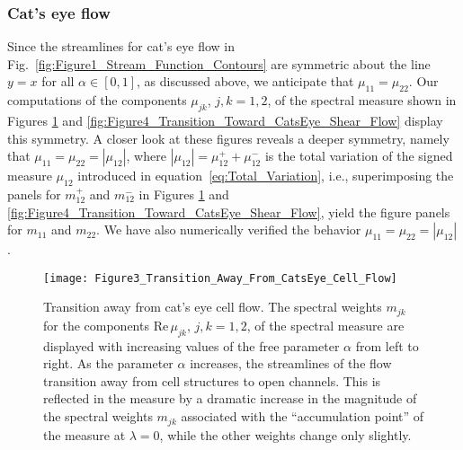 \documentclass[english,12pt,jmp,graphicx]{revtex4-1}
\newcommand{\figref}[1]{Fig.~\ref{#1}}
\newcommand{\numfigref}[1]{\ref{#1}}
\newcommand{\Real}{\mbox{Re}\,}
\begin{document}
\subsubsection{Cat's eye flow}\label{sec:Cats_Eye_Flow}
%
Since the streamlines for cat's eye flow in
\figref{fig:Figure1_Stream_Function_Contours} are symmetric about the
line $y=x$ for all $\alpha\in[0,1]$, as discussed above, we anticipate
that $\mu_{11}=\mu_{22}$. Our computations of the
components $\mu_{jk}$, $j,k=1,2$, of the spectral measure shown in
Figures \numfigref{fig:Figure3_Transition_Away_From_CatsEye_Cell_Flow} and
\numfigref{fig:Figure4_Transition_Toward_CatsEye_Shear_Flow}
display this symmetry. A closer look
at these figures reveals a deeper symmetry, namely that
$\mu_{11}=\mu_{22}=|\mu_{12}|$, where $|\mu_{12}|=\mu_{12}^++\mu_{12}^-$ is the
total variation of the signed measure $\mu_{12}$ introduced in
equation~\eqref{eq:Total_Variation}, i.e., superimposing the 
panels for $m_{12}^+$ and $m_{12}^-$ in Figures \numfigref{fig:Figure3_Transition_Away_From_CatsEye_Cell_Flow} and
\numfigref{fig:Figure4_Transition_Toward_CatsEye_Shear_Flow}, yield
the figure panels for 
$m_{11}$ and $m_{22}$. We have also numerically verified the behavior
$\mu_{11}=\mu_{22}=|\mu_{12}|$. 

%
\begin{figure}[t]
  \centerline{\texttt{[image: Figure3\_Transition\_Away\_From\_CatsEye\_Cell\_Flow]}} 
\caption{%
  Transition away from cat's eye cell flow. The spectral weights
  $m_{jk}$ for the components $\Real\mu_{jk}$, $j,k=1,2$, of the
  spectral measure are displayed with increasing values of the free
  parameter $\alpha$ from left to right. As the parameter $\alpha$ 
  increases, the streamlines of the flow transition away from
  cell structures to open channels. This is reflected in the
  measure by a dramatic increase in the magnitude of the spectral
  weights $m_{jk}$ associated with the ``accumulation point'' of the measure at
  $\lambda=0$, while the other weights change only slightly.   
        }
\label{fig:Figure3_Transition_Away_From_CatsEye_Cell_Flow}
\end{figure}
%
\end{document}
